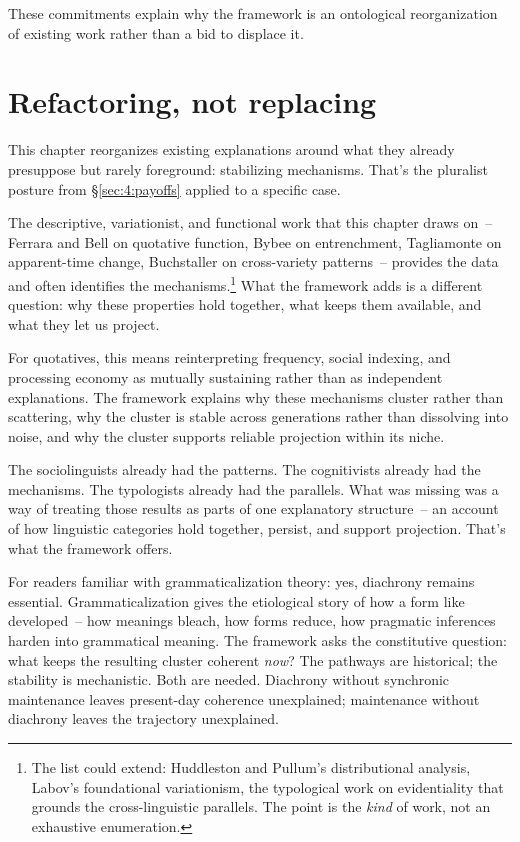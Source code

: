 These commitments explain why the framework is an ontological reorganization of existing work rather than a bid to displace it.


\section{Refactoring, not replacing}
\label{sec:6:refactoring}

This chapter reorganizes existing explanations around what they already presuppose but rarely foreground: stabilizing mechanisms. That's the pluralist posture from §\ref{sec:4:payoffs} applied to a specific case.

The descriptive, variationist, and functional work that this chapter draws on~-- Ferrara and Bell on quotative function, Bybee on entrenchment, Tagliamonte on apparent-time change, Buchstaller on cross-variety patterns~-- provides the data and often identifies the mechanisms.\footnote{The list could extend: Huddleston and Pullum's distributional analysis, Labov's foundational variationism, the typological work on evidentiality that grounds the cross-linguistic parallels. The point is the \emph{kind} of work, not an exhaustive enumeration.} What the framework adds is a different question: why these properties hold together, what keeps them available, and what they let us project.

For quotatives, this means reinterpreting frequency, social indexing, and processing economy as mutually sustaining rather than as independent explanations. The framework explains why these mechanisms cluster rather than scattering, why the cluster is stable across generations rather than dissolving into noise, and why the cluster supports reliable projection within its niche.

The sociolinguists already had the patterns. The cognitivists already had the mechanisms. The typologists already had the parallels. What was missing was a way of treating those results as parts of one explanatory structure~-- an account of how linguistic categories hold together, persist, and support projection. That's what the framework offers.

For readers familiar with grammaticalization theory: yes, diachrony remains essential. Grammaticalization gives the etiological story of how a form like  developed~-- how meanings bleach, how forms reduce, how pragmatic inferences harden into grammatical meaning. The framework asks the constitutive question: what keeps the resulting cluster coherent \emph{now}? The pathways are historical; the stability is mechanistic. Both are needed. Diachrony without synchronic maintenance leaves present-day coherence unexplained; maintenance without diachrony leaves the trajectory unexplained.


